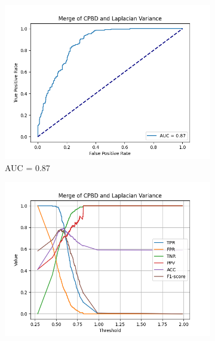 \begin{figure}[H]
    \begin{subfigure}[t]{0.48\textwidth}
        \includegraphics[width=\textwidth]{Figures/cpbd_lv_alpha_6_png/output_roc_cpbd_lv.png}
        \caption{AUC = 0.87}
    \end{subfigure}\hspace{1em}
    \begin{subfigure}[t]{0.48\textwidth}
        \includegraphics[width=\textwidth]{Figures/cpbd_lv_alpha_6_png/threshold_test_scores_cpbd_lv.png}
        \caption{}
    \end{subfigure}\hspace{1em}
    \caption{}
    \label{fig:CPBD_LV_png}
\end{figure}



